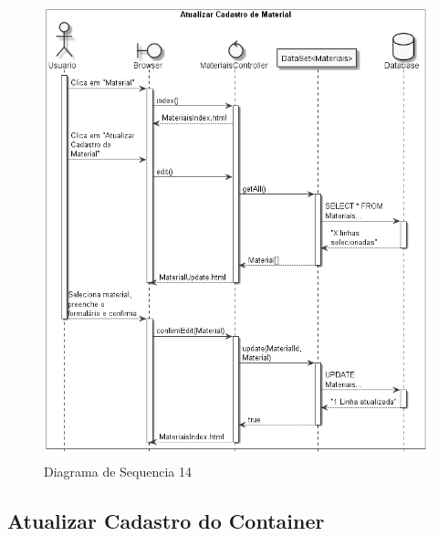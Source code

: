 \documentclass[rascunho,xindy,acronym,symbols]{fei}
\begin{document}
\begin{figure}[H]
    \centering
    \includegraphics[width=\textwidth]{./Images/DS_Atualizar_Cadastro_Material.jpg}
    \caption{Diagrama de Sequencia 14}
    \label{fig:diag_seq14}
\end{figure}

\subsection{Atualizar Cadastro do Container}
\end{document}
